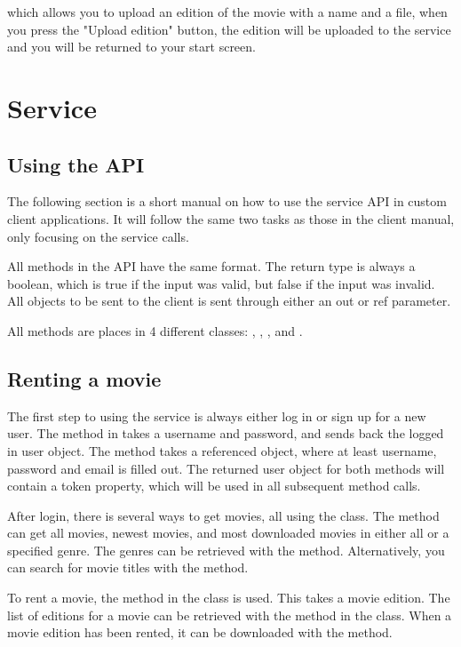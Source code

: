  which allows you to upload an edition of the movie with a name and a file, when you press the "Upload edition" button, the edition will be uploaded to the service and you will be returned to your start screen.

\section{Service}
\label{Manual_Service}

\subsection{Using the API}
\label{Manual_Service_Usage}
The following section is a short manual on how to use the service API in custom client applications. It will follow the same two tasks as those in the client manual, only focusing on the service calls.

All methods in the API have the same format. The return type is always a boolean, which is true if the input was valid, but false if the input was invalid. All objects to be sent to the client is sent through either an out or ref parameter.

All methods are places in 4 different classes: , , , and .

\subsection{Renting a movie}
\label{Manual_Service_Usage_Rent}
The first step to using the service is always either log in or sign up for a new user. The  method in  takes a username and password, and sends back the logged in user object. The  method takes a referenced  object, where at least username, password and email is filled out. The returned user object for both methods will contain a token property, which will be used in all subsequent method calls.

After login, there is several ways to get movies, all using the  class. The  method can get all movies, newest movies, and most downloaded movies in either all or a specified genre. The genres can be retrieved with the  method. Alternatively, you can search for movie titles with the  method.

To rent a movie, the  method in the  class is used. This takes a movie edition. The list of editions for a movie can be retrieved with the  method in the  class. When a movie edition has been rented, it can be downloaded with the  method.

